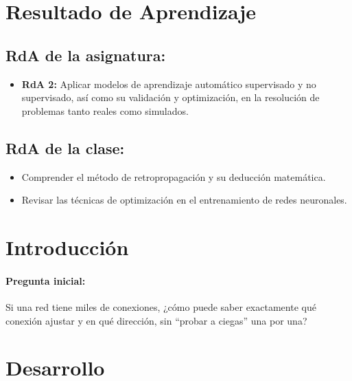 \documentclass[a4,11pt]{aleph-notas}
\begin{document}
\encabezado

\section*{Resultado de Aprendizaje}

\subsection*{RdA de la asignatura:}
\begin{itemize}[leftmargin=*]
    \item \textbf{RdA 2:} Aplicar modelos de aprendizaje automático supervisado y no supervisado, así como su validación y optimización, en la resolución de problemas tanto reales como simulados.
\end{itemize}

\subsection*{RdA de la clase:}
\begin{itemize}[leftmargin=*]
    \item Comprender el método de retropropagación y su deducción matemática.
    \item Revisar las técnicas de optimización en el entrenamiento de redes neuronales.
\end{itemize}

\section*{Introducción}

\paragraph{Pregunta inicial:}
Si una red tiene miles de conexiones, ¿cómo puede saber exactamente qué conexión ajustar y en qué dirección, sin “probar a ciegas” una por una?

\section*{Desarrollo}
\end{document}
